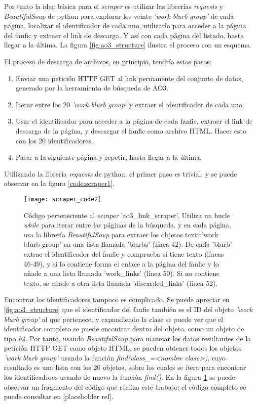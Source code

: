 \documentclass{pre-tfg}
\newcommand{\refToLinkScraperCode}{[placeholder ref]}
\begin{document}
Por tanto la idea básica para el \textit{scraper} es utilizar las librerías \textit{requests} y \textit{BeautifulSoup} de python para explorar los veinte \textit{'work blurb group'} de cada página, localizar el identificador de cada uno, utilizarlo para acceder a la página del fanfic y extraer el link de descarga. Y así con cada página del listado, hasta llegar a la última. La figura \ref{fig:ao3_structure} ilustra el proceso con un esquema.

El proceso de descarga de archivos, en principio, tendría estos pasos:

\begin{enumerate}
	\item Enviar una petición HTTP GET al link permanente del conjunto de datos, generado por la herramienta de búsqueda de AO3.
	\item Iterar entre los 20 \textit{'work blurb group'} y extraer el identificador de cada uno.
	\item Usar el identificador para acceder a la página de cada fanfic, extraer el link de descarga de la página, y descargar el fanfic como archivo HTML. Hacer esto con los 20 identificadores.
	\item Pasar a la siguiente página y repetir, hasta llegar a la última.
\end{enumerate}

Utilizando la librería \textit{requests} de python, el primer paso es trivial, y se puede observar en la figura \ref{code:scraper1}.

\begin{figure}
	\texttt{[image: scraper\_code2]}
	\caption{Código perteneciente al \textit{scraper} 'ao3\_link\_scraper'. Utiliza un bucle \textit{while} para iterar entre las páginas de la búsqueda, y en cada página, usa la librería \textit{BeautifulSoup} para extraer los objetos textit{'work blurb group'} en una lista llamada 'blurbs' (línea 42). De cada 'blurb' extrae el identificador del fanfic y comprueba si tiene texto (líneas 46-49), y si lo contiene forma el enlace a la página del fanfic y lo añade a una lista llamada 'work\_links' (línea 50). Si no contiene texto, se añade a otra lista llamada 'discarded\_links' (línea 52).}
	\label{code:scraper2}
\end{figure}

Encontrar los identificadores tampoco es complicado. Se puede apreciar en \ref{fig:ao3_structure} que el identificador del fanfic también es el ID del objeto \textit{'work blurb group'} al que pertenece, y expandiendo la clase se puede ver que el identificador completo se puede encontrar dentro del objeto, como un objeto de tipo \textit{h4}. Por tanto, usando \textit{BeautifulSoup} para manejar los datos resultantes de la petición HTTP GET como objeto HTML, se pueden obtener todos los objetos \textit{'work blurb group'} usando la función \textit{find(class\_=<nombre clase>)}, cuyo resultado es una lista con los 20 objetos, sobre los cuales se itera para encontrar los identificadores usando de nuevo la función \textit{find()}. En la figura \ref{code:scraper2} se puede observar un fragmento del código que realiza este trabajo; el código completo se puede consultar en \refToLinkScraperCode.
\end{document}
